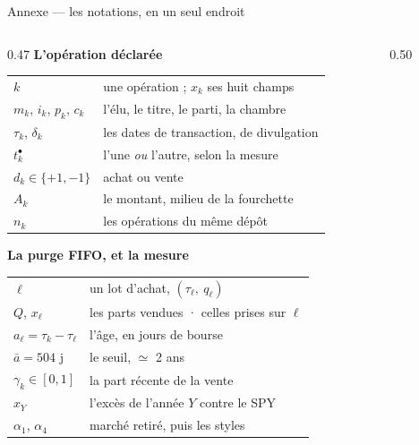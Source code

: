 \documentclass[11pt,aspectratio=169]{beamer}
\begin{document}
\begin{frame}{Annexe --- les notations, en un seul endroit}
  \begin{columns}[T]
    \begin{column}{0.47\textwidth}
      {\color{bleu}\bfseries\footnotesize L'opération déclarée}\par\vspace{1mm}
      {\scriptsize\setlength{\tabcolsep}{4pt}
      \begin{tabular}{@{}l >{\raggedright\arraybackslash}p{4.7cm}@{}}
        $k$ & une opération ; $x_k$ ses huit champs\\
        $m_k$, $i_k$, $p_k$, $c_k$ & l'élu, le titre, le parti, la chambre\\
        $\tau_k$, $\delta_k$ & les dates de transaction, de divulgation\\
        $t^{\bullet}_k$ & l'une \emph{ou} l'autre, selon la mesure\\
        $d_k \in \{+1,-1\}$ & achat ou vente\\
        $A_k$ & le montant, milieu de la fourchette\\
        $n_k$ & les opérations du même dépôt\\
      \end{tabular}}\par\vspace{2mm}
      {\color{bleu}\bfseries\footnotesize La purge FIFO, et la mesure}\par\vspace{1mm}
      {\scriptsize\setlength{\tabcolsep}{4pt}
      \begin{tabular}{@{}l >{\raggedright\arraybackslash}p{4.7cm}@{}}
        $\ell$ & un lot d'achat, $(\tau_\ell,\ q_\ell)$\\
        $Q$, $x_\ell$ & les parts vendues · celles prises sur $\ell$\\
        $a_\ell = \tau_k - \tau_\ell$ & l'âge, en jours de bourse\\
        $\bar a = 504$ j & le seuil, $\simeq$ 2 ans\\
        $\gamma_k \in [0,1]$ & la part récente de la vente\\
        \midrule
        $x_Y$ & l'excès de l'année $Y$ contre le SPY\\
        $\alpha_1$, $\alpha_4$ & marché retiré, puis les styles\\
      \end{tabular}}
    \end{column}
    \begin{column}{0.50\textwidth}

\end{column}
\end{columns}
\end{frame}
\end{document}
